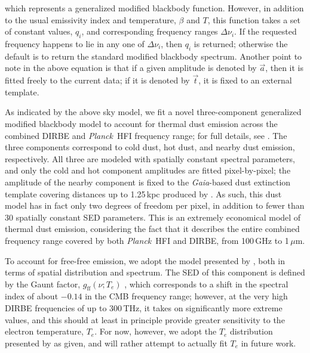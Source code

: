 \documentclass{aa}
\def\Planck{\textit{Planck}}
\def\GAIA{\textit{Gaia}}
\renewcommand{\t}[0]{\vec{t}}
\renewcommand{\a}[0]{\vec{a}}
\begin{document}
which represents a generalized modified blackbody function. However,
in addition to the usual emissivity index and temperature, $\beta$ and
$T$, this function takes a set of constant values, $q_i$, and
corresponding frequency ranges $\Delta\nu_i$. If the requested
frequency happens to lie in any one of $\Delta\nu_i$, then $q_i$ is
returned; otherwise the default is to return the standard modified
blackbody spectrum. Another point to note in the above equation is
that if a given amplitude is denoted by $\a$, then it is fitted freely
to the current data; if it is denoted by $\t$, it is fixed to an
external template.

As indicated by the above sky model, we fit a novel three-component
generalized modified blackbody model to account for thermal dust
emission across the combined DIRBE and \Planck\ HFI frequency range;
for full details, see \citet{CG02_05}. The three components correspond
to cold dust, hot dust, and nearby dust emission, respectively. All
three are modeled with spatially constant spectral parameters, and
only the cold and hot component amplitudes are fitted pixel-by-pixel;
the amplitude of the nearby component is fixed to the \GAIA-based dust
extinction template covering distances up to 1.25\,kpc produced by
\citet{edenhofer:2024}.  As such, this dust model has in fact only two
degrees of freedom per pixel, in addition to fewer than 30 spatially
constant SED parameters. This is an extremely economical model of
thermal dust emission, considering the fact that it describes the
entire combined frequency range covered by both \Planck\ HFI and
DIRBE, from 100\,GHz to 1\,$\mu$m.

To account for free-free emission, we adopt the model presented by
\citet{planck2014-a11}, both in terms of spatial distribution and
spectrum. The SED of this component is defined by the Gaunt factor,
$g_{\mathrm{ff}}(\nu; T_e)$ \citep{dickinson:2003,draine:2011}, which
corresponds to a shift in the spectral index of about $-0.14$ in the
CMB frequency range; however, at the very high DIRBE frequencies of up
to 300\,THz, it takes on significantly more extreme values, and this
should at least in principle provide greater sensitivity to the
electron temperature, $T_e$. For now, however, we adopt the $T_e$
distribution presented by \citet{planck2014-a11} as given, and will
rather attempt to actually fit $T_e$ in future work.
\end{document}
